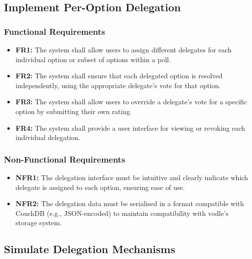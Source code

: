 \subsection{Implement Per-Option Delegation}
\subsubsection{Functional Requirements}
\begin{itemize}
    \item \textbf{FR1:} The system shall allow users to assign different delegates for each individual option or subset of options within a poll.

    \item \textbf{FR2:} The system shall ensure that each delegated option is resolved independently, using the appropriate delegate's vote for that option.

    \item \textbf{FR3:} The system shall allow users to override a delegate's vote for a specific option by submitting their own rating.

    \item \textbf{FR4:} The system shall provide a user interface for viewing or revoking each individual delegation.
\end{itemize}

\subsubsection{Non-Functional Requirements}
\begin{itemize}
    \item \textbf{NFR1:} The delegation interface must be intuitive and clearly indicate which delegate is assigned to each option, ensuring ease of use.

    \item \textbf{NFR2:} The delegation data must be serialised in a format compatible with CouchDB (e.g., JSON-encoded) to maintain compatibility with vodle's storage system.
\end{itemize}
\subsection{Simulate Delegation Mechanisms}
